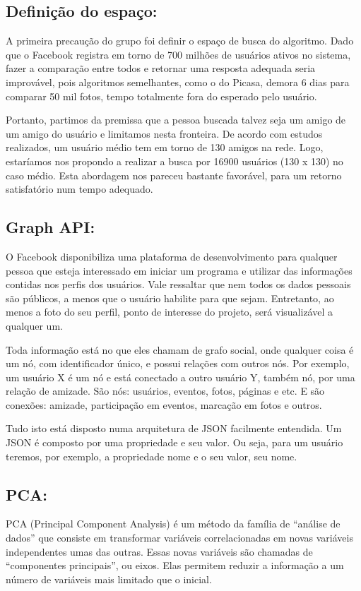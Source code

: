 \documentclass[10pt,a4paper]{article}
\begin{document}
\subsection*{Definição do espaço:}

	A primeira precaução do grupo foi definir o espaço de busca do algoritmo. Dado que o Facebook registra em torno de 700 milhões de usuários ativos no sistema, fazer a comparação entre todos e retornar uma resposta adequada seria improvável, pois algoritmos semelhantes, como o do Picasa, demora 6 dias para comparar 50 mil fotos, tempo totalmente fora do esperado pelo usuário.

	Portanto, partimos da premissa que a pessoa buscada talvez
        seja um amigo de um amigo do usuário e limitamos nesta
        fronteira. De acordo com estudos realizados, um usuário médio
        tem em torno de 130 amigos na rede. Logo, estaríamos nos
        propondo a realizar a busca por 16900 usuários (130 x 130) no
        caso médio. Esta abordagem nos pareceu bastante favorável,
        para um retorno satisfatório num tempo adequado.

\subsection*{Graph API:}
O Facebook disponibiliza uma plataforma de desenvolvimento para qualquer pessoa que esteja interessado em iniciar um programa e utilizar das informações contidas nos perfis dos usuários. Vale ressaltar que nem todos os dados pessoais são públicos, a menos que o usuário habilite para que sejam. Entretanto, ao menos a foto do seu perfil, ponto de interesse do projeto, será visualizável a qualquer um.

	Toda informação está no que eles chamam de grafo social, onde qualquer coisa é um nó, com identificador único, e possui relações com outros nós. Por exemplo, um usuário X é um nó e está conectado a outro usuário Y, também nó, por uma relação de amizade. São nós: usuários, eventos, fotos, páginas e etc. E são conexões: amizade, participação em eventos, marcação em fotos e outros.

	Tudo isto está disposto numa arquitetura de JSON facilmente
        entendida. Um JSON é composto por uma propriedade e seu
        valor. Ou seja, para um usuário teremos, por exemplo, a
        propriedade nome e o seu valor, seu nome.


\subsection*{PCA:}
	PCA (Principal Component Analysis) é um método da família de “análise de dados” que consiste em transformar variáveis correlacionadas em novas variáveis independentes umas das outras. Essas novas variáveis são chamadas de “componentes principais”, ou eixos. Elas permitem reduzir a informação a um número de variáveis mais limitado que o inicial.
\end{document}
